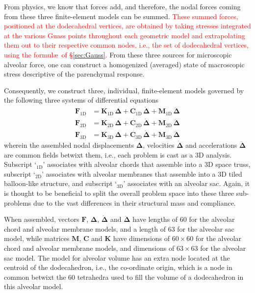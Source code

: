 From physics, we know that forces add, and therefore, the nodal forces coming from these three finite-element models can be summed.  \textcolor{red}{These summed forces, positioned at the dodecahedral vertices, are obtained by taking stresses integrated at the various Guass points throughout each geometric model and extrapolating them out to their respective common nodes, i.e., the set of dodecahedral vertices, using the formul\ae\ of \S\ref{sec:Gauss}.}  From these three sources for micro\-scopic alveolar force, one can construct a homo\-genized (averaged) state of macro\-scopic stress descriptive of the parenchymal response.

Consequently, we construct three, individual, finite-element models governed by the following three systems of differential equations
\begin{subequations}
    \label{EofMotion}
	\begin{align}
    \boldsymbol{F}_{\mathrm{1D}} & =
    \mathbf{K}_{\mathrm{1D}} \, \boldsymbol{\Delta} +
    \mathbf{C}_{\mathrm{1D}} \, \dot{\boldsymbol{\Delta}} +
    \mathbf{M}_{\mathrm{1D}} \, \ddot{\boldsymbol{\Delta}} \\
    \boldsymbol{F}_{\mathrm{2D}} & =
    \mathbf{K}_{\mathrm{2D}} \, \boldsymbol{\Delta} +
    \mathbf{C}_{\mathrm{2D}} \, \dot{\boldsymbol{\Delta}} + 
    \mathbf{M}_{\mathrm{2D}} \, \ddot{\boldsymbol{\Delta}} \\
    \boldsymbol{F}_{\mathrm{3D}} & = 
    \mathbf{K}_{\mathrm{3D}} \, \boldsymbol{\Delta} +
    \mathbf{C}_{\mathrm{3D}} \, \dot{\boldsymbol{\Delta}} + 
    \mathbf{M}_{\mathrm{3D}} \, \ddot{\boldsymbol{\Delta}}
	\end{align}
\end{subequations}
wherein the assembled nodal displacements $\boldsymbol{\Delta}$, velocities $\dot{\boldsymbol{\Delta}}$ and accelerations $\ddot{\boldsymbol{\Delta}}$ are common fields betwixt them, i.e., each problem is cast as a 3D analysis.  Subscript `$\mbox{}_{\mathrm{1D}}$' associates with alveolar chords that assemble into a 3D space truss, subscript `$\mbox{}_{\mathrm{2D}}$' associates with alveolar membranes that assemble into a 3D tiled balloon-like structure, and subscript `$\mbox{}_{\mathrm{3D}}$' associates with an alveolar sac.  Again, it is thought to be beneficial to split the overall problem space into these three sub-problems due to the vast differences in their structural mass and compliance.

When assembled, vectors $\boldsymbol{F}$, $\boldsymbol{\Delta}$, $\dot{\boldsymbol{\Delta}}$ and $\ddot{\boldsymbol{\Delta}}$ have lengths of 60 for the alveolar chord and alveolar membrane models, and a length of 63 for the alveolar sac model, while matrices $\mathbf{M}$, $\mathbf{C}$ and $\mathbf{K}$ have dimensions of $60 \! \times \! 60$ for the alveolar chord and alveolar membrane models, and dimensions of $63 \! \times \! 63$ for the alveolar sac model.  The model for alveolar volume has an extra node located at the centroid of the dodecahedron, i.e., the co-ordinate origin, which is a node in common betwixt the 60 tetrahedra used to fill the volume of a dodecahedron in this alveolar model. 


